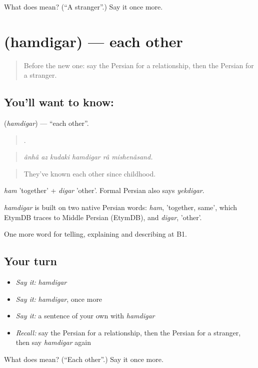 \begin{tcolorbox}[breakable,colback=teal!4,colframe=teal!35!black,title={Before you move on}]
What does  mean? (\textquotedblleft{}A stranger\textquotedblright{}.) Say it once more.
\end{tcolorbox}
\section[\texorpdfstring{\fa{همدیگر} (hamdigar)}{همدیگر (hamdigar)}]{ (hamdigar) — each other}

\label{lesson:FA-C504-hamdigar}



\begin{quote}
Before the new one: say the Persian for a relationship, then the Persian for a stranger.
\end{quote}

\subsection*{You'll want to know: }
\textbf{} (\emph{hamdigar}) — \textquotedblleft{}each other\textquotedblright{}.

\begin{quote}
     .
\end{quote}

\begin{quote}
\emph{ânhâ az kudaki hamdigar râ mishenâsand.}
\end{quote}

\begin{quote}
They've known each other since childhood.
\end{quote}

\emph{ham} 'together' + \emph{digar} 'other'. Formal Persian also says \emph{yekdigar}.

\begin{cousinweb}
\emph{hamdigar} is built on two native Persian words: \emph{ham}, 'together, same', which EtymDB traces to Middle Persian (EtymDB), and \emph{digar}, 'other'.
\end{cousinweb}

\begin{grammarlens}[title={What you've built}]
One more word for telling, explaining and describing at B1.
\end{grammarlens}

\subsection*{Your turn}
\begin{itemize}
\raggedright
  \item \emph{Say it:} \emph{hamdigar}
  \item \emph{Say it:} \emph{hamdigar}, once more
  \item \emph{Say it:} a sentence of your own with \emph{hamdigar}
  \item \emph{Recall:} say the Persian for a relationship, then the Persian for a stranger, then say \emph{hamdigar} again
\end{itemize}

\begin{tcolorbox}[breakable,colback=teal!4,colframe=teal!35!black,title={Before you move on}]
What does  mean? (\textquotedblleft{}Each other\textquotedblright{}.) Say it once more.
\end{tcolorbox}
